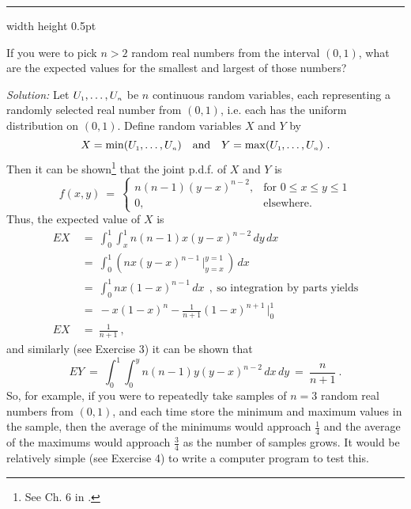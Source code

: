 \vspace{3mm}
\hrule width \textwidth height 0.5pt
\begin{exmp}\label{exmp:minmaxexpval}
 If you were to pick $n > 2$ random real numbers from the interval $(0,1)$, what are the expected values for the
 smallest and largest of those numbers?\vspace{1mm}
 \par\noindent \emph{Solution:} Let $U_{\scriptscriptstyle 1}, \dots , U_{\scriptscriptstyle n}$ be $n$ continuous random variables,
 each representing a randomly selected real number from $(0,1)$, i.e. each has the uniform distribution on $(0,1)$.
 Define random variables $X$ and $Y$ by
 \begin{displaymath}
  X = \min(U_{\scriptscriptstyle 1}, \dots , U_{\scriptscriptstyle n}) \quad \text{and} \quad Y = \max(U_{\scriptscriptstyle 1}, \dots , U_{\scriptscriptstyle n}) ~.
 \end{displaymath}
 Then it can be shown\footnote{See Ch. 6 in \cite{hps}.} that the joint p.d.f. of $X$ and $Y$ is
\begin{equation}\label{eqn:minmaxexpval}
 f(x,y) ~=~ \begin{cases}
  n(n-1)(y-x)^{n-2}, &\text{for $0 \le x \le y \le 1$}\\
  0, &\text{elsewhere.}
 \end{cases}
\end{equation}
Thus, the expected value of $X$ is
\begin{align*}
 EX ~&=~ \int_0^1 \int_x^1 n(n-1)x(y-x)^{n-2} \,dy\,dx\\
  &=~ \int_0^1 \left( nx(y-x)^{n-1} \,\Big|_{y=x}^{y=1} \,\right)\,dx\\
  &=~ \int_0^1 nx(1-x)^{n-1} \,dx~~,~\text{so integration by parts yields}\\
  &=~ -x(1-x)^n - \frac{1}{n+1}(1-x)^{n+1} \,\Big|_0^1\\
 EX ~&=~ \frac{1}{n+1} ~,
\end{align*}
and similarly (see Exercise 3) it can be shown that
\begin{displaymath}
 EY ~=~ \int_0^1 \int_0^y n(n-1)y(y-x)^{n-2} \,dx\,dy ~=~ \frac{n}{n+1} ~.
\end{displaymath}
So, for example, if you were to repeatedly take samples of $n=3$ random real numbers from $(0,1)$, and each time store
the minimum and maximum values in the sample, then the average of the minimums would approach $\frac{1}{4}$ and the
average of the maximums would approach $\frac{3}{4}$ as the number of samples grows. It would be relatively simple (see
Exercise 4) to write a computer program to test this.
\end{exmp}\vspace{-6mm}
